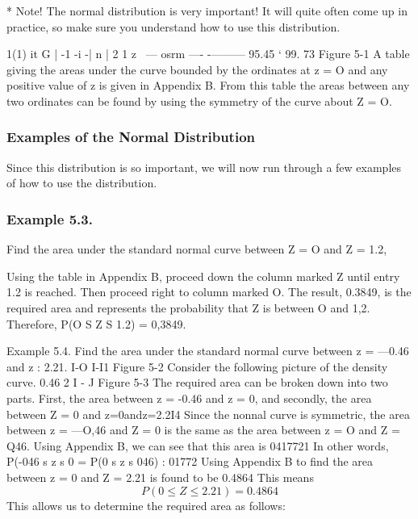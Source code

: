 * Note!
The normal distribution is very important! It will quite often
come up in practice, so make sure you understand how to
use this distribution.

1(1)
it
G
|
-1 -i -| n | 2 1 z
~— osrm —-
-——— 95.45%
‘ 99. 73%
Figure 5-1
A table giving the areas under the curve bounded by the ordinates
at z = O and any positive value of z is given in Appendix B. From this
table the areas between any two ordinates can be found by using the
symmetry of the curve about Z = O.


\subsubsection*{Examples of the Normal Distribution}
Since this distribution is so important, we will now run through a few
examples of how to use the distribution.

\subsubsection{Example 5.3.} 
Find the area under the standard normal curve between Z = O and Z = 1.2,

Using the table in Appendix B, proceed down the column marked
Z until entry 1.2 is reached. Then proceed right to column marked O. The
result, 0.3849, is the required area and represents the probability that Z
is between O and 1,2. Therefore, P(O S Z S 1.2) = 0,3849.



Example 5.4. Find the area under the standard normal curve
between z = —0.46 and z : 2.21.
I-O I-I1
Figure 5-2
Consider the following picture of the density curve.
0.46 2 I
- J
Figure 5-3
The required area can be broken down into two parts. First, the area
between z = -0.46 and z = 0, and secondly, the area between Z = 0 and
z=0andz=2.2I4
Since the nonnal curve is symmetric, the area between z = —O,46
and Z = 0 is the same as the area between z = O and Z = Q46. Using
Appendix B, we can see that this area is 0417721 In other words,
P(-046 s z s 0 = P(0 s z s 046) : 01772
Using Appendix B to ﬁnd the area between z = 0 and Z = 2.21 is
found to be 0.4864 This means
\[P(0 \leq Z \leq 2.21) = 0.4864\]
This allows us to determine the required area as follows:

